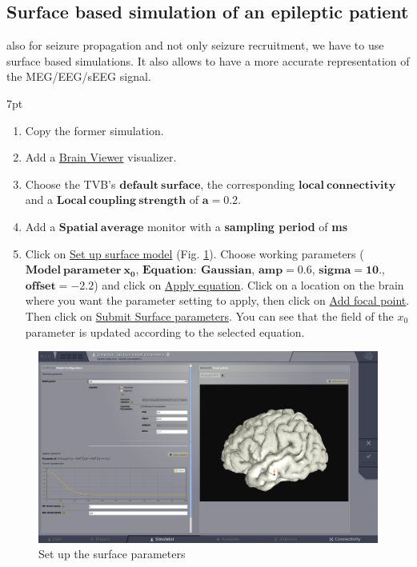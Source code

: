 \documentclass{tufte-handout}
\newenvironment{simulation}{%
  \def\FrameCommand{%
    \hspace{1pt}%
    {\color{ForestGreen}\vrule width 2pt}%
    {\color{simulationshade}\vrule width 4pt}%
    \colorbox{simulationshade}%
  }%
  \MakeFramed{\advance\hsize-\width\FrameRestore}%
  \noindent\hspace{-4.55pt}%
  \begin{adjustwidth}{}{7pt}%
  \vspace{2pt}\vspace{2pt}%
}
{%
  \vspace{2pt}\end{adjustwidth}\endMakeFramed%
}
\begin{document}
\subsection{Surface based simulation of an epileptic patient}

  also for seizure propagation and not only seizure recruitment, we have to use surface based simulations.
 It also allows to have a more accurate representation of the MEG/EEG/sEEG signal.
 
  \begin{simulation}
  \begin{enumerate}
  \item Copy the former simulation.
  \item Add a \underline{Brain Viewer} visualizer.
  \item Choose the TVB's $\mathbf{default\:surface}$, the corresponding  $\mathbf{local\:connectivity}$ and a $\mathbf{Local\:coupling\:strength}$ of $\mathbf{a=0.2}$.
  \item Add a $\mathbf{Spatial\:average}$ monitor with a \textbf{sampling period} of \textbf{\unit[1]{ms}}
  \item Click on \underline{Set up surface model} (Fig. \ref{fig:set_up_surface_parameters}). Choose working parameters
  ($\mathbf{Model\:parameter\:x_0}$, $\mathbf{Equation:\:Gaussian}$, $\mathbf{amp=0.6}$, $\mathbf{sigma=10.}$, $\mathbf{offset=-2.2}$) and 
  click on \underline{Apply equation}.
  Click on a location on the brain where you want the parameter setting to apply, then click on \underline{Add focal point}.
  Then click on \underline{Submit Surface parameters}. You can see that the field of the $x_0$ parameter is updated according to the selected equation.
  \end{enumerate}
\end{simulation}

\begin{figure}[h]
  \includegraphics[width=\linewidth]{Handout_UI_ModellingAnEpilepticPatient_SetUpSurfaceParameters}%
  \caption{Set up the surface parameters}%
  \label{fig:set_up_surface_parameters}%
\end{figure}
\end{document}
